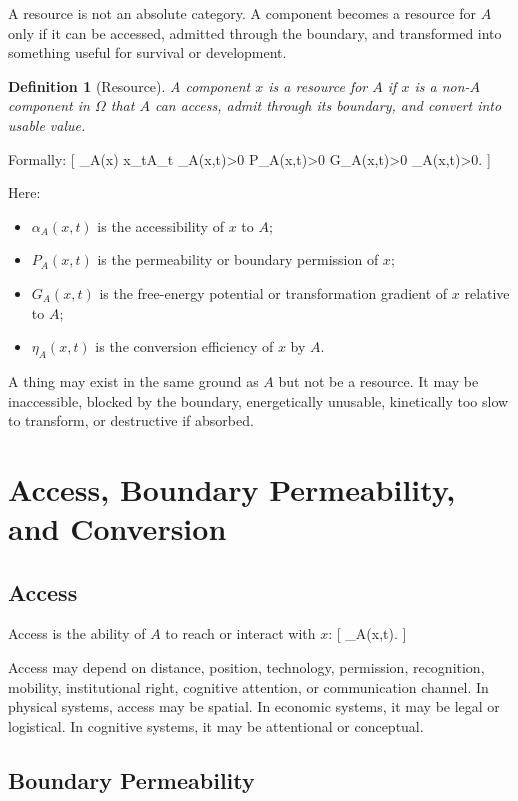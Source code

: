 \documentclass[11pt,a4paper]{article}
\newtheorem{definition}{Definition}
\newcommand{\Resource}{\operatorname{Resource}}
\begin{document}
A resource is not an absolute category. A component becomes a resource for $A$ only if it can be accessed, admitted through the boundary, and transformed into something useful for survival or development.

\begin{definition}[Resource]
A component $x$ is a resource for $A$ if $x$ is a non-$A$ component in $\Omega$ that $A$ can access, admit through its boundary, and convert into usable value.
\end{definition}

Formally:
[
\Resource_A(x)
\Longleftrightarrow
x\in\Omega_t\setminus A_t
\wedge
\alpha_A(x,t)>0
\wedge
P_A(x,t)>0
\wedge
G_A(x,t)>0
\wedge
\eta_A(x,t)>0.
]

Here:
\begin{itemize}[leftmargin=2em]
\item $\alpha_A(x,t)$ is the accessibility of $x$ to $A$;
\item $P_A(x,t)$ is the permeability or boundary permission of $x$;
\item $G_A(x,t)$ is the free-energy potential or transformation gradient of $x$ relative to $A$;
\item $\eta_A(x,t)$ is the conversion efficiency of $x$ by $A$.
\end{itemize}

A thing may exist in the same ground as $A$ but not be a resource. It may be inaccessible, blocked by the boundary, energetically unusable, kinetically too slow to transform, or destructive if absorbed.

\section{Access, Boundary Permeability, and Conversion}

\subsection{Access}

Access is the ability of $A$ to reach or interact with $x$:
[
\alpha_A(x,t).
]

Access may depend on distance, position, technology, permission, recognition, mobility, institutional right, cognitive attention, or communication channel. In physical systems, access may be spatial. In economic systems, it may be legal or logistical. In cognitive systems, it may be attentional or conceptual.

\subsection{Boundary Permeability}
\end{document}
